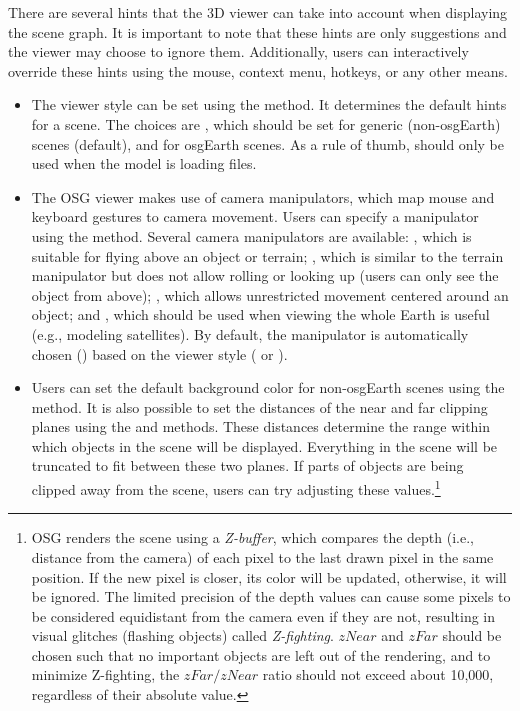 There are several hints that the 3D viewer can take into account when displaying
the scene graph. It is important to note that these hints are only suggestions
and the viewer may choose to ignore them. Additionally, users can interactively
override these hints using the mouse, context menu, hotkeys, or any other means.

\begin{itemize}

  \item {} The viewer style can be set using the
     method. It determines the default hints for a
    scene. The choices are , which should be set for generic
    (non-osgEarth) scenes (default), and  for osgEarth scenes.
    As a rule of thumb,  should only be used when the model is
    loading  files.

  \item {} The OSG viewer makes use of camera
    manipulators, which map mouse and keyboard gestures to camera movement.
    Users can specify a manipulator using the 
    method. Several camera manipulators are available: , which
    is suitable for flying above an object or terrain; , which
    is similar to the terrain manipulator but does not allow rolling or looking
    up (users can only see the object from above); , which
    allows unrestricted movement centered around an object; and ,
    which should be used when viewing the whole Earth is useful (e.g., modeling
    satellites). By default, the manipulator is automatically chosen
    () based on the viewer style ( or
    ).

  \item {} Users can set the default background color for
    non-osgEarth scenes using the  method. It is also
    possible to set the distances of the near and far clipping planes using the
     and  methods. These distances determine
    the range within which objects in the scene will be displayed. Everything in the
    scene will be truncated to fit between these two planes. If parts of
    objects are being clipped away from the scene, users can try adjusting these
    values.\footnote{OSG renders the scene using a \textit{Z-buffer}, which
    compares the depth (i.e., distance from the camera) of each pixel to the
    last drawn pixel in the same position. If the new pixel is closer, its color
    will be updated, otherwise, it will be ignored. The limited precision of the
    depth values can cause some pixels to be considered equidistant from the
    camera even if they are not, resulting in visual glitches (flashing objects) called
    \textit{Z-fighting}. $zNear$ and $zFar$ should be chosen such that no
    important objects are left out of the rendering, and to minimize Z-fighting,
    the $zFar/zNear$ ratio should not exceed about 10,000, regardless of their absolute value.}


\end{itemize}
